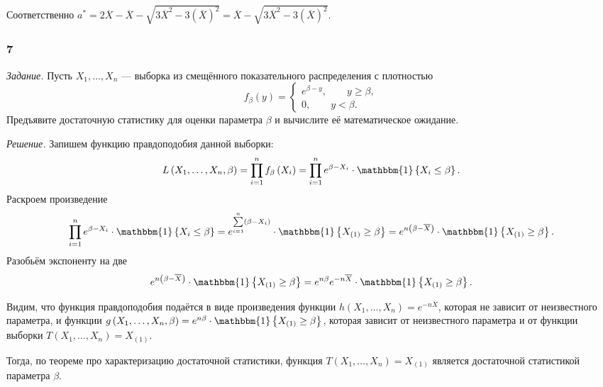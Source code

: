 Соответственно
$a^* =
  2 \overline{X} - \overline{X} - \sqrt{3 \overline{X}^2 - 3 \left( \overline{X} \right)^2} =
  \overline{X} - \sqrt{3 \overline{X}^2 - 3 \left( \overline{X} \right)^2}$.


\subsubsection*{7}

\textit{Задание.}
Пусть $X_1, \dotsc, X_n$ --- выборка из смещённого показательного распределения с плотностью
$$f_{ \beta } \left( y \right) =
  \begin{cases}
    e^{ \beta - y}, \qquad y \geq \beta, \\
    0, \qquad y < \beta.
  \end{cases}$$
Предъявите достаточную статистику для оценки параметра $ \beta $
и вычислите её математическое ожидание.

\textit{Решение.} Запишем функцию правдоподобия данной выборки:
$$L \left( X_1, \dotsc, X_n, \beta \right) =
  \prod \limits_{i = 1}^n f_{ \beta } \left( X_i \right) =
  \prod \limits_{i = 1}^n e^{ \beta - X_i} \cdot \mathbbm{1} \left\{ X_i \leq \beta \right\}.$$
Раскроем произведение
$$ \prod \limits_{i = 1}^n e^{ \beta - X_i} \cdot \mathbbm{1} \left\{ X_i \leq \beta \right\} =
  e^{ \sum \limits_{i = 1}^n \left( \beta - X_i \right) } \cdot
  \mathbbm{1} \left\{ X_{ \left( 1 \right) } \geq \beta \right\} =
  e^{n \left( \beta - \overline{X} \right) } \cdot
  \mathbbm{1} \left\{ X_{ \left( 1 \right) } \geq \beta \right\}.$$
Разобьём экспоненту на две
$$e^{n \left( \beta - \overline{X} \right) } \cdot
  \mathbbm{1} \left\{ X_{ \left( 1 \right) } \geq \beta \right\} =
  e^{n \beta } e^{-n \overline{X}} \cdot
  \mathbbm{1} \left\{ X_{ \left( 1 \right) } \geq \beta \right\}.$$

Видим,
что функция правдоподобия подаётся в виде произведения функции
$h \left( X_1, \dotsc, X_n \right) = e^{-n \overline{X}}$,
которая не зависит от неизвестного параметра,
и функции
$g \left( X_1, \dotsc, X_n, \beta \right) =
  e^{n \beta } \cdot \mathbbm{1} \left\{ X_{ \left( 1 \right) } \geq \beta \right\} $,
которая зависит от неизвестного параметра и от функции выборки
$T \left( X_1, \dotsc, X_n \right) =
  X_{ \left( 1 \right) }$.

Тогда, по теореме про характеризацию достаточной статистики,
функция $T \left( X_1, \dotsc, X_n \right) = X_{ \left( 1 \right) }$
является достаточной статистикой параметра $ \beta $.

